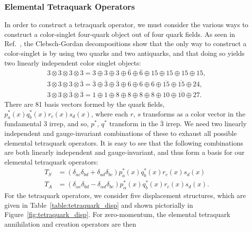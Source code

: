     \subsubsection{Elemental Tetraquark Operators}
    In order to construct a tetraquark operator, we must consider the various ways to construct a color-singlet four-quark object out of four quark fields. As seen in Ref.~\cite{pittir33243}, the Clebsch-Gordan decompositions show that the only way to construct a color-singlet is by using two quarks and two antiquarks, and that doing so yields two linearly independent color singlet objects:
    \begin{equation}
    \begin{array}{l}
        {3 \otimes 3 \otimes 3 \otimes 3=3\oplus3\oplus3\oplus\overline{6}\oplus\overline{6}\oplus15\oplus15\oplus15\oplus15},\\
        {3 \otimes 3 \otimes 3 \otimes \overline{3}=\overline{3}\oplus\overline{3}\oplus\overline{3}\oplus6\oplus6\oplus6\oplus\overline{15}\oplus\overline{15}\oplus24},\\
        {3 \otimes 3 \otimes \overline{3} \otimes \overline{3}=1\oplus1\oplus8\oplus8\oplus8\oplus8\oplus10\oplus\overline{10}\oplus27}.
    \end{array}
    \end{equation}
    There are 81 basis vectors formed by the quark fields, $p_{a}^{*}(x) q_{b}^{*}(x) r_{c}(x) s_{d}(x)$, where each $r$, $s$ transforms as a color vector in the fundamental $3$ irrep, and so, $p^{*}$, $q^{*}$ transform in the $\overline 3$ irrep. We need two linearly independent and gauge-invariant combinations of these to exhaust all possible elemental tetraquark operators. It is easy to see that the following combinations are both linearly independent and gauge-invariant, and thus form a basis for our elemental tetraquark operators:
    \begin{equation}\label{eq:tsta}
    \begin{aligned} T_{S} &=\left(\delta_{a c} \delta_{b d}+\delta_{a d} \delta_{b c}\right) p_{a}^{*}(x) q_{b}^{*}(x) r_{c}(x) s_{d}(x) \\ T_{A} &=\left(\delta_{\alpha c} \delta_{b d}-\delta_{\alpha d} \delta_{b c}\right) p_{\alpha}^{*}(x) q_{b}^{*}(x) r_{c}(x) s_{d}(x).\end{aligned}
    \end{equation}
    For the tetraquark operators, we consider five displacement structures, which are given in Table~\ref{table:tetraquark_disp} and shown pictorially in Figure~\ref{fig:tetraquark_disp}. For zero-momentum, the elemental tetraquark annihilation and creation operators are then
